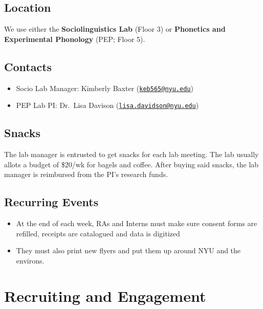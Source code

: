 \documentclass[
]{book}
\providecommand{\tightlist}{%
  \setlength{\itemsep}{0pt}\setlength{\parskip}{0pt}}
\begin{document}
\hypertarget{location}{%
\section{Location}\label{location}}

We use either the \textbf{Sociolinguistics Lab} (Floor 3) or \textbf{Phonetics and Experimental Phonology} (PEP; Floor 5).

\hypertarget{contacts}{%
\section{Contacts}\label{contacts}}

\begin{itemize}
\tightlist
\item
  Socio Lab Manager: Kimberly Baxter (\href{mailto:keb565@nyu.edu}{\nolinkurl{keb565@nyu.edu}})
\item
  PEP Lab PI: Dr.~Lisa Davison (\href{mailto:lisa.davidson@nyu.edu}{\nolinkurl{lisa.davidson@nyu.edu}})
\end{itemize}

\hypertarget{snacks}{%
\section{Snacks}\label{snacks}}

The lab manager is entrusted to get snacks for each lab meeting. The lab usually allots a budget of \$20/wk for bagels and coffee. After buying said snacks, the lab manager is reimbursed from the PI's research funds.

\hypertarget{recurring-events}{%
\section{Recurring Events}\label{recurring-events}}

\begin{itemize}
\tightlist
\item
  At the end of each week, RAs and Interns must make sure consent forms are refilled, receipts are catalogued and data is digitized
\item
  They must also print new flyers and put them up around NYU and the environs.
\end{itemize}

\hypertarget{recruiting-and-engagement}{%
\chapter{Recruiting and Engagement}\label{recruiting-and-engagement}}
\end{document}
